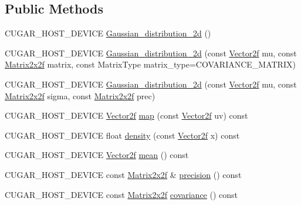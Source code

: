 \subsection*{Public Methods}
\begin{DoxyCompactItemize}
\item 
C\+U\+G\+A\+R\+\_\+\+H\+O\+S\+T\+\_\+\+D\+E\+V\+I\+CE \hyperlink{structcugar_1_1_gaussian__distribution__2d_a291aa81b6b608aeca5a532ecdbdef68c}{Gaussian\+\_\+distribution\+\_\+2d} ()
\item 
C\+U\+G\+A\+R\+\_\+\+H\+O\+S\+T\+\_\+\+D\+E\+V\+I\+CE \hyperlink{structcugar_1_1_gaussian__distribution__2d_aad832a2b320dccb09161bd79a33e19fb}{Gaussian\+\_\+distribution\+\_\+2d} (const \hyperlink{structcugar_1_1_vector}{Vector2f} mu, const \hyperlink{structcugar_1_1_matrix}{Matrix2x2f} matrix, const Matrix\+Type matrix\+\_\+type=C\+O\+V\+A\+R\+I\+A\+N\+C\+E\+\_\+\+M\+A\+T\+R\+IX)
\item 
C\+U\+G\+A\+R\+\_\+\+H\+O\+S\+T\+\_\+\+D\+E\+V\+I\+CE \hyperlink{structcugar_1_1_gaussian__distribution__2d_aad6906acd6d313a1a880d178438b9ff3}{Gaussian\+\_\+distribution\+\_\+2d} (const \hyperlink{structcugar_1_1_vector}{Vector2f} mu, const \hyperlink{structcugar_1_1_matrix}{Matrix2x2f} sigma, const \hyperlink{structcugar_1_1_matrix}{Matrix2x2f} prec)
\item 
C\+U\+G\+A\+R\+\_\+\+H\+O\+S\+T\+\_\+\+D\+E\+V\+I\+CE \hyperlink{structcugar_1_1_vector}{Vector2f} \hyperlink{structcugar_1_1_gaussian__distribution__2d_a2a225669b7d1f39a0d946a551561f26f}{map} (const \hyperlink{structcugar_1_1_vector}{Vector2f} uv) const
\item 
C\+U\+G\+A\+R\+\_\+\+H\+O\+S\+T\+\_\+\+D\+E\+V\+I\+CE float \hyperlink{structcugar_1_1_gaussian__distribution__2d_a001503b87c988e4cfddbf8814f83a93b}{density} (const \hyperlink{structcugar_1_1_vector}{Vector2f} x) const
\item 
C\+U\+G\+A\+R\+\_\+\+H\+O\+S\+T\+\_\+\+D\+E\+V\+I\+CE \hyperlink{structcugar_1_1_vector}{Vector2f} \hyperlink{structcugar_1_1_gaussian__distribution__2d_a76ef27708f0faf2dc05df010ac7a832c}{mean} () const
\item 
C\+U\+G\+A\+R\+\_\+\+H\+O\+S\+T\+\_\+\+D\+E\+V\+I\+CE const \hyperlink{structcugar_1_1_matrix}{Matrix2x2f} \& \hyperlink{structcugar_1_1_gaussian__distribution__2d_a8791393607fd2cd1a35e61a3656216e5}{precision} () const
\item 
C\+U\+G\+A\+R\+\_\+\+H\+O\+S\+T\+\_\+\+D\+E\+V\+I\+CE const \hyperlink{structcugar_1_1_matrix}{Matrix2x2f} \hyperlink{structcugar_1_1_gaussian__distribution__2d_adb453934ce1db8c170a2e783449241c1}{covariance} () const
\end{DoxyCompactItemize}


